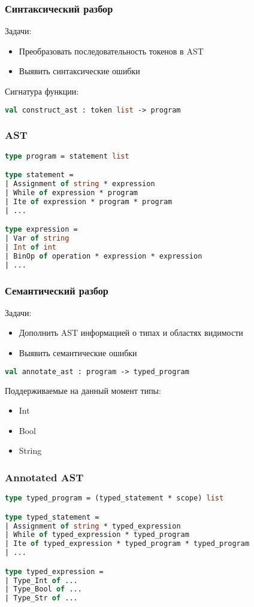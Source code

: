 \documentclass{beamer}
\begin{document}
	\begin{frame}[fragile]
		\frametitle{Синтаксический разбор}
		Задачи:
		\begin{itemize}
			\item Преобразовать последовательность токенов в AST
			\item Выявить синтаксические ошибки
		\end{itemize}
		Сигнатура функции:	
		\begin{lstlisting}[language=ML] 
	val construct_ast : token list -> program
		\end{lstlisting}
		\end{frame}

	\begin{frame}[fragile]
		\frametitle{AST}
		\begin{lstlisting}[language=ML] 
type program = statement list

type statement =
| Assignment of string * expression
| While of expression * program
| Ite of expression * program * program
| ...

type expression =
| Var of string
| Int of int
| BinOp of operation * expression * expression
| ...
		\end{lstlisting}
	\end{frame}
	
		\begin{frame}[fragile]
			\frametitle{Семантический разбор}
			Задачи:
			\begin{itemize}
				\item Дополнить AST информацией о типах и областях видимости
				\item Выявить семантические ошибки
			\end{itemize}
			\begin{lstlisting}[language=ML] 
		val annotate_ast : program -> typed_program
			\end{lstlisting}
			Поддерживаемые на данный момент типы:
			\begin{itemize}
				\item Int
				\item Bool
				\item String
			\end{itemize}
		\end{frame}

	\begin{frame}[fragile]
		\frametitle{Annotated AST}
		\begin{lstlisting}[basicstyle=\footnotesize\ttfamily, language=ML]
type typed_program = (typed_statement * scope) list

type typed_statement =
| Assignment of string * typed_expression
| While of typed_expression * typed_program
| Ite of typed_expression * typed_program * typed_program
| ...

type typed_expression =
| Type_Int of ...
| Type_Bool of ...
| Type_Str of ...
		\end{lstlisting}
	\end{frame}
\end{document}
